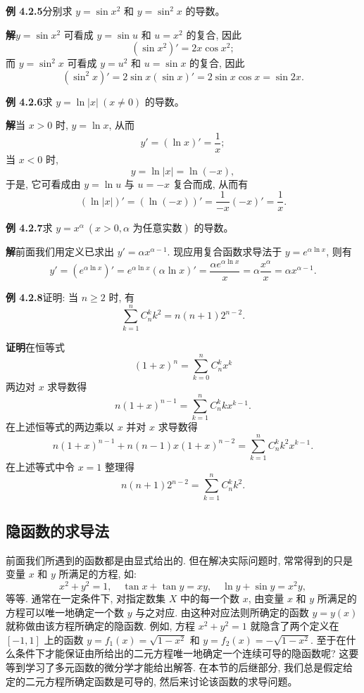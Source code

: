 \documentclass[UTF8, 12pt, fontset=fandol, oneside]{ctexart}
\begin{document}
\noindent\textbf{例 4.2.5}\quad 分别求 $y=\sin x^2$ 和 $y=\sin^2x$ 的导数。

\noindent\textbf{解}\quad $y=\sin x^2$ 可看成 $y=\sin u$ 和 $u=x^2$ 的复合, 因此
\[
  (\sin x^2)'=2x\cos x^2;
\]
而 $y=\sin^2x$ 可看成 $y=u^2$ 和 $u=\sin x$ 的复合, 因此
\[
  (\sin^2x)'=2\sin x(\sin x)'=2\sin x\cos x=\sin2x.
\]

\noindent\textbf{例 4.2.6}\quad 求 $y=\ln|x|\ (x\ne0)$ 的导数。

\noindent\textbf{解}\quad 当 $x>0$ 时, $y=\ln x$, 从而
\[
  y'=(\ln x)'=\frac1x;
\]
当 $x<0$ 时,
\[
  y=\ln|x|=\ln(-x),
\]
于是, 它可看成由 $y=\ln u$ 与 $u=-x$ 复合而成, 从而有
\[
  (\ln|x|)'=(\ln(-x))'=\frac1{-x}(-x)'=\frac1x.
\]

\noindent\textbf{例 4.2.7}\quad 求 $y=x^\alpha\ (x>0,\alpha\text{ 为任意实数})$ 的导数。

\noindent\textbf{解}\quad 前面我们用定义已求出 $y'=\alpha x^{\alpha-1}$. 现应用复合函数求导法于 $y=e^{\alpha\ln x}$, 则有
\[
  y'=(e^{\alpha\ln x})'
  =
  e^{\alpha\ln x}(\alpha\ln x)'
  =
  \frac{\alpha e^{\alpha\ln x}}x
  =
  \alpha\frac{x^\alpha}x
  =
  \alpha x^{\alpha-1}.
\]

\noindent\textbf{例 4.2.8}\quad 证明: 当 $n\geqslant2$ 时, 有
\[
  \sum_{k=1}^{n}C_n^kk^2=n(n+1)2^{n-2}.
\]

\noindent\textbf{证明}\quad 在恒等式
\[
  (1+x)^n=\sum_{k=0}^{n}C_n^kx^k
\]
两边对 $x$ 求导数得
\[
  n(1+x)^{n-1}=\sum_{k=1}^{n}C_n^kkx^{k-1}.
\]
在上述恒等式的两边乘以 $x$ 并对 $x$ 求导数得
\[
  n(1+x)^{n-1}+n(n-1)x(1+x)^{n-2}
  =
  \sum_{k=1}^{n}C_n^kk^2x^{k-1}.
\]
在上述等式中令 $x=1$ 整理得
\[
  n(n+1)2^{n-2}=\sum_{k=1}^{n}C_n^kk^2.
\]

\subsection{隐函数的求导法}

前面我们所遇到的函数都是由显式给出的. 但在解决实际问题时, 常常得到的只是变量 $x$ 和 $y$ 所满足的方程, 如:
\[
  x^2+y^2=1,\quad \tan x+\tan y=xy,\quad \ln y+\sin y=x^2y,
\]
等等. 通常在一定条件下, 对指定数集 $X$ 中的每一个数 $x$, 由变量 $x$ 和 $y$ 所满足的方程可以唯一地确定一个数 $y$ 与之对应. 由这种对应法则所确定的函数 $y=y(x)$ 就称做由该方程所确定的隐函数. 例如, 方程 $x^2+y^2=1$ 就隐含了两个定义在 $[-1,1]$ 上的函数 $y=f_1(x)=\sqrt{1-x^2}$ 和 $y=f_2(x)=-\sqrt{1-x^2}$. 至于在什么条件下才能保证由所给出的二元方程唯一地确定一个连续可导的隐函数呢? 这要等到学习了多元函数的微分学才能给出解答. 在本节的后继部分, 我们总是假定给定的二元方程所确定函数是可导的, 然后来讨论该函数的求导问题。
\end{document}
